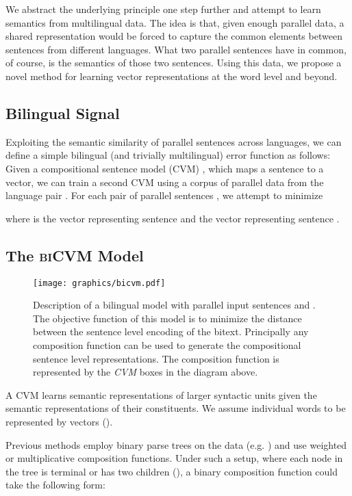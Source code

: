 \documentclass{article} \pdfoutput=1
\newcommand{\biCVM}{\textsc{biCVM}\xspace}
\newcommand{\CVM}{\textsc{CVM}\xspace}
\begin{document}
We abstract the underlying principle one step further and attempt to learn semantics from multilingual data.
The idea is that, given enough parallel data, a shared representation would be forced to capture the common elements between sentences from different languages.
What two parallel sentences have in common, of course, is the semantics of those two sentences.
Using this data, we propose a novel method for learning vector representations at the word level and beyond.

\subsection{Bilingual Signal}

Exploiting the semantic similarity of parallel sentences across languages, we
can define a simple bilingual (and trivially multilingual) error function as
follows: Given a compositional sentence model (\CVM) , which maps
a sentence to a vector, we can train a second \CVM  using a
corpus  of parallel data from the language pair .  For
each pair of parallel sentences , we attempt to
minimize

where  is the vector representing sentence  and  the vector representing sentence .

\subsection{The \biCVM Model}

\begin{figure}[t]
\begin{center}
\texttt{[image: graphics/bicvm.pdf]}
\caption{Description of a bilingual model with parallel input sentences  and . The objective function of this model is to minimize the distance between the sentence level encoding of the bitext. Principally any composition function can be used to generate the compositional sentence level representations. The composition function is represented by the \textit{CVM} boxes in the diagram above.
}\label{fig:bilingual}
\end{center}
\end{figure}

A \CVM learns semantic representations of larger syntactic units given the semantic representations of their constituents.
We assume individual words to be represented by vectors ().

Previous methods employ binary parse trees on the data (e.g. \cite{Hermann:2013:ACL,Socher:2012}) and use weighted or multiplicative composition functions.
Under such a setup, where each node in the tree is terminal or has two children (), a binary composition function could take the following form:
\end{document}
